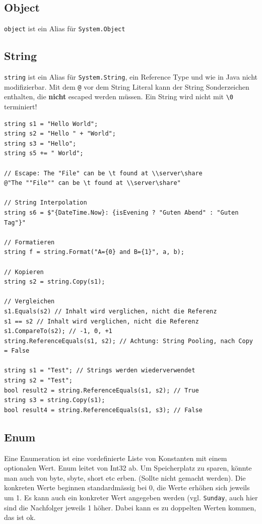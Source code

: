 \documentclass[
a4paper,
oneside,
10pt,
fleqn,
headsepline,
toc=listofnumbered, 
bibliography=totocnumbered]{scrartcl}
\begin{document}
\subsection{Object}

\lstinline|object| ist ein Alias für \lstinline|System.Object|

\subsection{String}

\lstinline|string| ist ein Alias für \lstinline|System.String|, ein Reference Type und wie in Java nicht modifizierbar. Mit dem \lstinline|@| vor dem String Literal kann der String Sonderzeichen enthalten, die \textbf{nicht} escaped werden müssen. Ein String wird nicht mit \lstinline|\0| terminiert!

\begin{lstlisting}
string s1 = "Hello World";
string s2 = "Hello " + "World";
string s3 = "Hello";
string s5 += " World";

// Escape: The "File" can be \t found at \\server\share
@"The ""File"" can be \t found at \\server\share"

// String Interpolation
string s6 = $"{DateTime.Now}: {isEvening ? "Guten Abend" : "Guten Tag"}"

// Formatieren
string f = string.Format("A={0} and B={1}", a, b);

// Kopieren
string s2 = string.Copy(s1);

// Vergleichen
s1.Equals(s2) // Inhalt wird verglichen, nicht die Referenz
s1 == s2 // Inhalt wird verglichen, nicht die Referenz
s1.CompareTo(s2); // -1, 0, +1 
string.ReferenceEquals(s1, s2); // Achtung: String Pooling, nach Copy = False

string s1 = "Test"; // Strings werden wiederverwendet
string s2 = "Test";
bool result2 = string.ReferenceEquals(s1, s2); // True
string s3 = string.Copy(s1);
bool result4 = string.ReferenceEquals(s1, s3); // False
\end{lstlisting}

\subsection{Enum}

Eine Enumeration ist eine vordefinierte Liste von Konstanten mit einem optionalen Wert. Enum leitet von Int32 ab. Um Speicherplatz zu sparen, könnte man auch von byte, sbyte, short etc erben. (Sollte nicht gemacht werden). %
Die konkreten Werte beginnen standardmässig bei 0, die Werte erhöhen sich jeweils um 1. Es kann auch ein konkreter Wert angegeben werden (vgl. \lstinline|Sunday|, auch hier sind die Nachfolger jeweils 1 höher. Dabei kann es zu doppelten Werten kommen, das ist ok.
\end{document}
